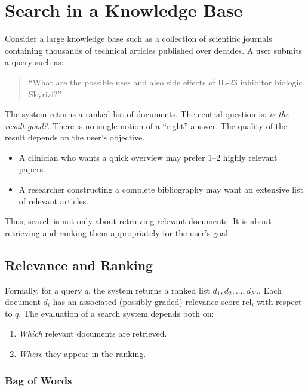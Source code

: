 \section{Search in a Knowledge Base}

\medskip

Consider a large knowledge base such as a collection of scientific journals containing thousands of technical articles published over decades. A user submits a query such as:

\begin{quote}
``What are the possible uses and also side effects of IL-23 inhibitor biologic Skyrizi?''
\end{quote}

The system returns a ranked list of documents. The central question is: \emph{is the result good?}. There is no single notion of a ``right'' answer. The quality of the result depends on the user's objective.

\begin{itemize}
    \item A clinician who wants a quick overview may prefer 1--2 highly relevant papers.
    \item A researcher constructing a complete bibliography may want an extensive list of relevant articles.
\end{itemize}

Thus, search is not only about retrieving relevant documents. It is about retrieving and ranking them appropriately for the user's goal.

\subsection{Relevance and Ranking}

Formally, for a query $q$, the system returns a ranked list $d_1, d_2, \dots, d_K.$. Each document $d_i$ has an associated (possibly graded) relevance score $\text{rel}_i$ with respect to $q$. The evaluation of a search system depends both on:
\begin{enumerate}
    \item \textit{Which} relevant documents are retrieved.
    \item \textit{Where} they appear in the ranking.
\end{enumerate}

\bigskip

\subsubsection{Bag of Words}

